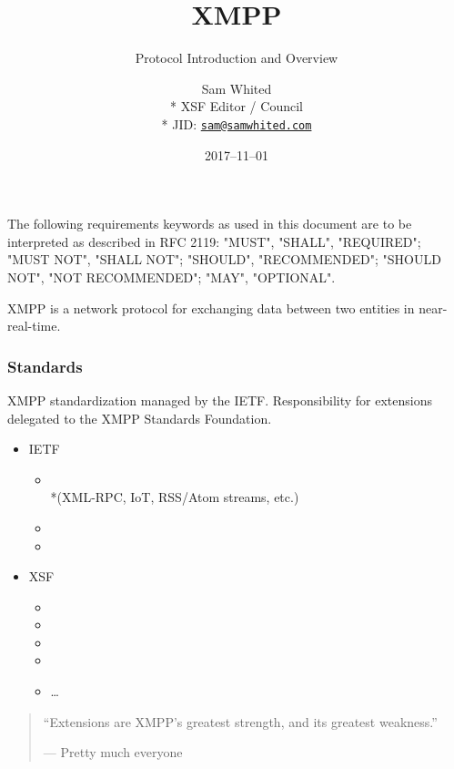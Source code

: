 \documentclass[xelatex,aspectratio=169]{beamer}
\title[]{XMPP}
\subtitle{Protocol Introduction and Overview}
\author[]{%
	Sam Whited\\*%
	{\tiny XSF Editor / Council}\\*%
	{\tiny JID: \texttt{\href{xmpp:sam@samwhited.com}{sam@samwhited.com}}}%
}
\date{2017--11--01}
\begin{document}
\begin{frame}
	\maketitle
\end{frame}

\begin{frame}
	\ttfamily%
	The following requirements keywords as used in this document are to be
	interpreted as described in RFC 2119: "MUST", "SHALL", "REQUIRED"; "MUST NOT",
	"SHALL NOT"; "SHOULD", "RECOMMENDED"; "SHOULD NOT", "NOT RECOMMENDED"; "MAY",
	"OPTIONAL".
\end{frame}

\begin{frame}
	XMPP is a network protocol for exchanging data between two entities in near-real-time.
\end{frame}

\begin{frame}
	\frametitle{Standards}
	XMPP standardization managed by the IETF. Responsibility for extensions
	delegated to the XMPP Standards Foundation.
	\begin{itemize}
		\item IETF
		\begin{itemize}
			\item \xmppcore\\*(XML-RPC, IoT, RSS/Atom streams, etc.)
			\item \xmppim
			\item \xmppaddr
		\end{itemize}
	\item XSF
		\begin{itemize}
			\item {}
			\item {}
			\item {}
			\item {}
		\item \ldots
		\end{itemize}
	\end{itemize}
\end{frame}

\begin{frame}
\begin{quotation}
	``Extensions are XMPP's greatest strength, and its greatest weakness.''
	\begin{flushright}
		--- Pretty much everyone
	\end{flushright}
\end{quotation}
\end{frame}
\end{document}
